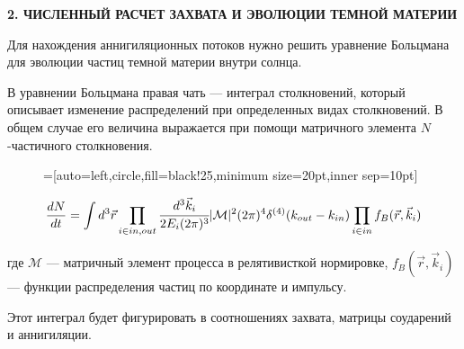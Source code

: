 \newpage
\begin{center}
	\textbf{\large 2. ЧИСЛЕННЫЙ РАСЧЕТ ЗАХВАТА И ЭВОЛЮЦИИ ТЕМНОЙ МАТЕРИИ}
\end{center}


Для нахождения аннигиляционных потоков нужно решить уравнение Больцмана для 
эволюции частиц темной материи внутри солнца.

В уравнении Больцмана правая чать --- интеграл столкновений, 
который описывает изменение распределений при определенных видах столкновений.
В общем случае его величина выражается при помощи матричного элемента 
$N$-частичного столкновения.
\\
\begin{figure}[!h]
	\centering
	=[auto=left,circle,fill=black!25,minimum size=20pt,inner sep=10pt]
\end{figure}
\begin{equation}
	\label{st_common}
	\frac{dN}{dt} =  \int d^3\vec{r} \prod_{i \in in,out} \cfrac{d^3\vec{k}_i}{2 E_i (2\pi)^3} |\mathcal{M}|^2 (2\pi)^4 \delta^{(4)}(k_{out} - k_{in}) \prod_{i \in in} f_B(\vec{r},\vec{k}_i)
\end{equation}

где $\mathcal{M}$ ---  матричный элемент процесса в релятивисткой нормировке,
$f_B(\vec{r},\vec{k}_i)$ --- функции распределения частиц по координате и импульсу.

Этот интеграл будет фигурировать в соотношениях захвата, матрицы соударений и аннигиляции.

